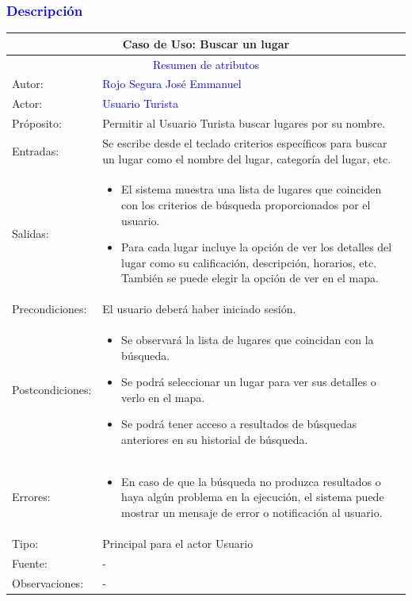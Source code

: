 \subsubsection{\textcolor{blue}{Descripción}}
\begin{tabularx}{16cm}{||l|X||}
	\hline
	\multicolumn{2}{||c||}{Caso de Uso: Buscar un lugar } \\
	\hline
	\multicolumn{2}{||c||}{\textcolor{blue}{Resumen de atributos}} \\
         \hline
	{Autor:} & {\textcolor{blue}{Rojo Segura José Emmanuel}} \\
	\hline
	\hline
	{Actor:} & {\textcolor{blue}{Usuario Turista}} \\
	\hline
	{Próposito:} & {Permitir al Usuario Turista buscar lugares por su nombre.} \\
	\hline
	{Entradas:} &  Se escribe desde el teclado criterios específicos para buscar un lugar como el nombre del lugar, categoría del lugar, etc.\\
	\hline
	{Salidas:} & 
        \begin{itemize}
        \item El sistema muestra una lista de lugares que coinciden con los criterios de búsqueda proporcionados por el usuario.
        \item Para cada lugar incluye la opción de ver los detalles del lugar como su calificación, descripción, horarios, etc. También se puede elegir la opción de ver en el mapa.
        \end{itemize} \\
	\hline
	{Precondiciones:} & El usuario deberá haber iniciado sesión.\\ 
	\hline
	{Postcondiciones:} & 
         \begin{itemize}
            \item Se observará la lista de lugares que coincidan con la búsqueda.
            \item Se podrá seleccionar un lugar para ver sus detalles o verlo en el mapa.
            \item Se podrá tener acceso a resultados de búsquedas anteriores en su historial de búsqueda.
        \end{itemize}\\
	\hline
	{Errores:} & \begin{itemize}
        \item En caso de que la búsqueda no produzca resultados o haya algún problema en la ejecución, el sistema puede mostrar un mensaje de error o notificación al usuario.
        \end{itemize}\\
	\hline
	{Tipo:} & Principal para el actor Usuario\\
	\hline
	{Fuente:} & {-} \\
	\hline
	{Observaciones:} & {-} \\
	\hline
\end{tabularx}


